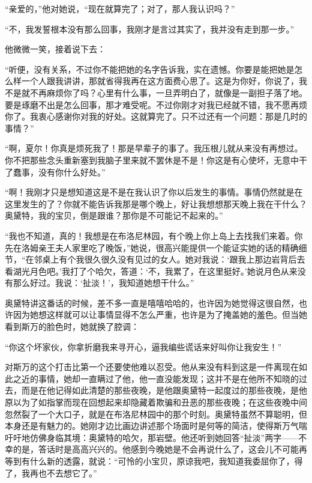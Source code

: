 \par “亲爱的，”他对她说，“现在就算完了；对了，那人我认识吗？”
\par “不，我发誓根本没有那么回事，我刚才是言过其实了，我并没有走到那一步。”
\par 他微微一笑，接着说下去：
\par “听便，没有关系，不过你不能把她的名字告诉我，实在遗憾。你要是能把她是怎么样一个人跟我讲讲，那就省得我再在这方面费心思了。这是为你好，你说了，我不是就不再麻烦你了吗？心里有什么事，一旦弄明白了，就像是一副担子落了地。要是琢磨不出是怎么回事，那才难受呢。不过你刚才对我已经就不错，我不愿再烦你了。我衷心感谢你对我的好处。这就算完了。只不过还有一个问题：那是几时的事情？”
\par “啊，夏尔！你真是烦死我了！那是早辈子的事了。我压根儿就从来没有再想过。你不把那些念头重新塞到我脑子里来就不罢休是不是！你这是有心使坏，无意中干了蠢事，没有你什么好处。”
\par “啊！我刚才只是想知道这是不是在我认识了你以后发生的事情。事情仍然就是在这里发生的了？你就不能告诉我那是哪个晚上，好让我想想那天晚上我在干什么？奥黛特，我的宝贝，倒是跟谁？那你是不可能记不起来的。”
\par “我也不知道，真的！我想是在布洛尼林园，有个晚上你上岛上去找我们来着。你先在洛姆亲王夫人家里吃了晚饭，”她说，很高兴能提供一个能证实她的话的精确细节，“在邻桌上有个我很久很久没有见过的女人。她对我说：‘跟我上那边岩背后去看湖光月色吧。’我打了个哈欠，答道：‘不，我累了，在这里挺好。’她说月色从来没有那么好过。我说：‘扯淡！’，我知道她想干什么。”
\par 奥黛特讲这番话的时候，差不多一直是嘻嘻哈哈的，也许因为她觉得这很自然，也许因为她想这样就可以让事情显得不怎么严重，也许是为了掩盖她的羞色。但当她看到斯万的脸色时，她就换了腔调：
\par “你这个坏家伙，你拿折磨我来寻开心，逼我编些谎话来好叫你让我安生！”
\par 对斯万的这个打击比第一个还要使他难以忍受。他从来没有料到这是一件离现在如此之近的事情，她却一直瞒过了他，他一直没能发现；这并不是在他所不知晓的过去，而是在他记得如此清楚的那些夜晚，是他跟奥黛特一起度过的那些夜晚，是他原以为了如指掌而现在回想起来却隐藏着欺骗和丑恶的那些夜晚；在这些夜晚中间忽然裂了一个大口子，就是在布洛尼林园中的那个时刻。奥黛特虽然不算聪明，但本身还是有魅力的。她刚才边比画边讲述那个场面时是何等的简洁，使得斯万气喘吁吁地仿佛身临其境：奥黛特的哈欠，那岩壁。他还听到她回答“扯淡”两字——不幸的是，答话时是高高兴兴的。他感到今晚她是不会再说什么了，这会儿不可能再等到有什么新的透露，就说：“可怜的小宝贝，原谅我吧，我知道我委屈你了，得了，我再也不去想它了。”
